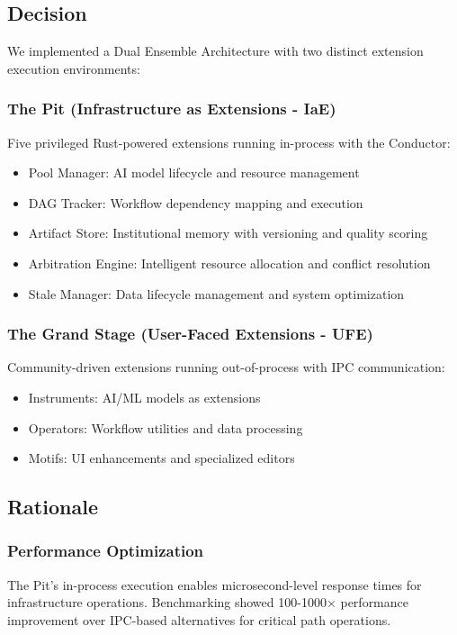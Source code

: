 \subsection*{Decision}

We implemented a Dual Ensemble Architecture with two distinct extension execution environments:

\subsubsection*{The Pit (Infrastructure as Extensions - IaE)}
Five privileged Rust-powered extensions running in-process with the Conductor:
\begin{itemize}
\item Pool Manager: AI model lifecycle and resource management
\item DAG Tracker: Workflow dependency mapping and execution
\item Artifact Store: Institutional memory with versioning and quality scoring
\item Arbitration Engine: Intelligent resource allocation and conflict resolution
\item Stale Manager: Data lifecycle management and system optimization
\end{itemize}

\subsubsection*{The Grand Stage (User-Faced Extensions - UFE)}
Community-driven extensions running out-of-process with IPC communication:
\begin{itemize}
\item Instruments: AI/ML models as extensions
\item Operators: Workflow utilities and data processing
\item Motifs: UI enhancements and specialized editors
\end{itemize}

\subsection*{Rationale}

\subsubsection*{Performance Optimization}
The Pit's in-process execution enables microsecond-level response times for infrastructure operations. Benchmarking showed 100-1000× performance improvement over IPC-based alternatives for critical path operations.

